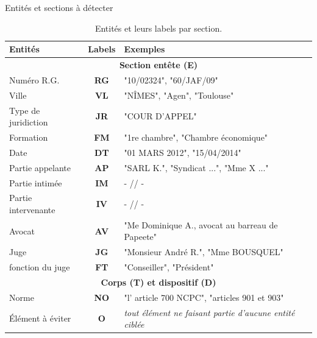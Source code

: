 \documentclass[newPxFont,pagenumber]{beamer}
\begin{document}
\begin{frame}{Entités et sections à détecter}

\scriptsize
\begin{table}[!htb]
\centering
\begin{tabular}[c]{|l|c|p{}|}
\hline
\textbf{Entités} & \textbf{Labels} & \textbf{Exemples}\\\hline
\multicolumn{3}{|c|}{\textbf{Section entête (E)}} \\
\hline
Numéro R.G. & \textbf{RG} & "10/02324", "60/JAF/09" \\ \hline
Ville & \textbf{VL}& "NÎMES", "Agen", "Toulouse" \\ \hline
Type de juridiction & \textbf{JR} & "COUR D'APPEL" \\ \hline
Formation & \textbf{FM} & "1re chambre", "Chambre économique" \\ \hline
Date & \textbf{DT} & "01 MARS 2012", "15/04/2014"\\ \hline
Partie appelante & \textbf{AP} & "SARL K.", "Syndicat ...", "Mme X ..."\\ \hline
Partie intimée & \textbf{IM} & - // - \\ \hline
Partie intervenante & \textbf{IV} & - // - \\ \hline
Avocat & \textbf{AV} & "Me Dominique A., avocat au barreau de Papeete"\\ \hline
Juge & \textbf{JG} & "Monsieur André R.", "Mme BOUSQUEL" \\ \hline
fonction du juge & \textbf{FT} & "Conseiller", "Président"\\ \hline
\multicolumn{3}{|c|}{\textbf{Corps (T) et dispositif (D)}} \\ \hline

Norme & \textbf{NO} & "l' article 700 NCPC", "articles 901 et 903"  \\ \hline
\hline
Élément à éviter & \textbf{O} & \textit{tout élément ne faisant partie d'aucune entité ciblée} \\ \hline
\end{tabular} 

\caption{Entités et leurs labels par section.}\label{relevantinfo}
\end{table}
\end{frame}
\end{document}
